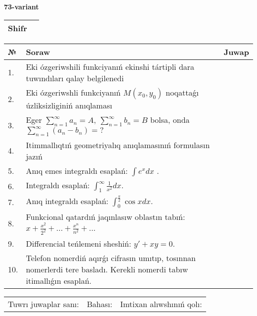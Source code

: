 \documentclass{article}
\begin{document}
  \egroup
  
  \newpage
  
  
  \textbf{73-variant}\\
  
  \bgroup
  \def\arraystretch{1.6} %
  
  \begin{tabular}{|m{5.7cm}|m{9.5cm}|}
  \hline
  Shifr & \\
  \hline
  \end{tabular}
  
  \vspace{1cm}
  
  \begin{tabular}{|m{0.7cm}|m{10cm}|m{4cm}|}
  \hline
  № & Soraw & Juwap \\
  \hline
  1. & Eki ózgeriwshili funkciyanıń ekinshi tártipli dara tuwındıları qalay belgilenedi &  \\
  \hline
  2. & Eki ózgeriwshli funkciyanıń \(M(x_{0}, y_{0})\) noqattaǵı úzliksizliginiń anıqlaması &  \\
  \hline
  3. & Eger \(\sum_{n = 1}^{\infty}a_{n} = A,\ \sum_{n = 1}^{\infty}b_{n} = B\) bolsa, onda \(\sum_{n = 1}^{\infty}\left( a_{n} - b_{n} \right) = ?\) &  \\
  \hline
  4. & Itimmallıqtıń geometriyalıq anıqlamasınıń formulasın jazıń &  \\
  \hline
  5. & Anıq emes integraldı esaplań: \(\int{e^{x}dx}\) . &  \\
  \hline
  6. & Integraldı esaplań: \(\int_{1}^{\infty}{\frac{1}{x^2 }dx}\). &  \\
  \hline
  7. & Anıq integraldı esaplań: \(\int_{0}^{\frac{\pi}{2}}{\cos xdx}\). &  \\
  \hline
  8. & Funkcional qatardıń jaqınlasıw oblastın tabıń: \(x + \frac{x^2 }{2^2 } + ... + \frac{x^{n}}{n^2 } + ...\) &  \\
  \hline
  9. & Differencial teńlemeni sheshiń: \(y' + xy = 0\). &  \\
  \hline
  10. & Telefon nomerdiń aqırǵı cifrasın umıtıp, tosınnan nomerlerdi tere basladı. Kerekli nomerdi tabıw itimallıǵın esaplań. &  \\
  \hline
  \end{tabular}
  
  \vspace{1cm}
  
  \begin{tabular}{lll}
  Tuwrı juwaplar sanı: \underline{\hspace{1.5cm}} & 
  Bahası: \underline{\hspace{1.5cm}} & 
  Imtixan alıwshınıń qolı: \underline{\hspace{2cm}} \\
  \end{tabular}
  
\end{document}
